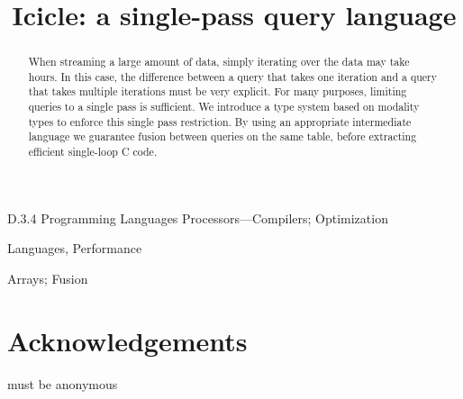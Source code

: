 \documentclass[preprint]{sigplanconf}
\begin{document}
\doi{}

\title{Icicle: a single-pass query language}


\maketitle
\makeatactive

\begin{abstract}
When streaming a large amount of data, simply iterating over the data may take hours.
In this case, the difference between a query that takes one iteration and a query that takes multiple iterations must be very explicit.
For many purposes, limiting queries to a single pass is sufficient.
We introduce a type system based on modality types to enforce this single pass restriction.
By using an appropriate intermediate language we guarantee fusion between queries on the same table, before extracting efficient single-loop C code.
\end{abstract}


\category
	{D.3.4}
	{Programming Languages}
	{Processors---Compilers; Optimization}

\terms
	Languages, Performance

\keywords
	Arrays; Fusion









% 

\section*{Acknowledgements}
must be anonymous



\end{document}
